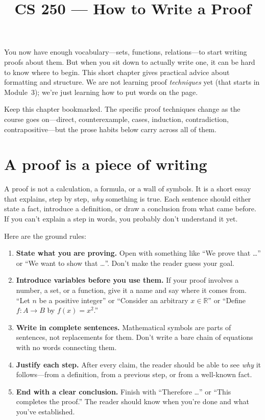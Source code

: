 \documentclass[11pt]{article}
\title{CS 250 --- How to Write a Proof}
\author{}
\date{}
\begin{document}
\maketitle

You now have enough vocabulary---sets, functions, relations---to start writing proofs about them. But when you sit down to actually write one, it can be hard to know where to begin. This short chapter gives practical advice about formatting and structure. We are not learning proof \emph{techniques} yet (that starts in Module~3); we're just learning how to put words on the page.

Keep this chapter bookmarked. The specific proof techniques change as the course goes on---direct, counterexample, cases, induction, contradiction, contrapositive---but the prose habits below carry across all of them.

\section{A proof is a piece of writing}

A proof is not a calculation, a formula, or a wall of symbols. It is a short essay that explains, step by step, \emph{why} something is true. Each sentence should either state a fact, introduce a definition, or draw a conclusion from what came before. If you can't explain a step in words, you probably don't understand it yet.

Here are the ground rules:
\begin{enumerate}
  \item \textbf{State what you are proving.} Open with something like ``We prove that \ldots'' or ``We want to show that \ldots''. Don't make the reader guess your goal.
  \item \textbf{Introduce variables before you use them.} If your proof involves a number, a set, or a function, give it a name and say where it comes from. ``Let $n$ be a positive integer'' or ``Consider an arbitrary $x \in \mathbb{R}$'' or ``Define $f : A \to B$ by $f(x) = x^2$.''
  \item \textbf{Write in complete sentences.} Mathematical symbols are parts of sentences, not replacements for them. Don't write a bare chain of equations with no words connecting them.
  \item \textbf{Justify each step.} After every claim, the reader should be able to see \emph{why} it follows---from a definition, from a previous step, or from a well-known fact.
  \item \textbf{End with a clear conclusion.} Finish with ``Therefore \ldots'' or ``This completes the proof.'' The reader should know when you're done and what you've established.
\end{enumerate}
\end{document}
